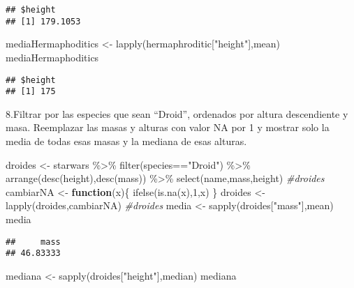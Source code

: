 \documentclass[
]{book}
\newenvironment{Shaded}{\begin{snugshade}}{\end{snugshade}}
\newcommand{\CommentTok}[1]{\textcolor[rgb]{0.56,0.35,0.01}{\textit{#1}}}
\newcommand{\ControlFlowTok}[1]{\textcolor[rgb]{0.13,0.29,0.53}{\textbf{#1}}}
\newcommand{\DecValTok}[1]{\textcolor[rgb]{0.00,0.00,0.81}{#1}}
\newcommand{\FunctionTok}[1]{\textcolor[rgb]{0.00,0.00,0.00}{#1}}
\newcommand{\NormalTok}[1]{#1}
\newcommand{\OtherTok}[1]{\textcolor[rgb]{0.56,0.35,0.01}{#1}}
\newcommand{\SpecialCharTok}[1]{\textcolor[rgb]{0.00,0.00,0.00}{#1}}
\newcommand{\StringTok}[1]{\textcolor[rgb]{0.31,0.60,0.02}{#1}}
\begin{document}
\begin{verbatim}
## $height
## [1] 179.1053
\end{verbatim}

\begin{Shaded}
\begin{Highlighting}[]
\NormalTok{mediaHermaphoditics }\OtherTok{\textless{}{-}} \FunctionTok{lapply}\NormalTok{(hermaphroditic[}\StringTok{"height"}\NormalTok{],mean)}
\NormalTok{mediaHermaphoditics}
\end{Highlighting}
\end{Shaded}

\begin{verbatim}
## $height
## [1] 175
\end{verbatim}

8.Filtrar por las especies que sean ``Droid'', ordenados por altura descendiente y masa. Reemplazar las masas y alturas con valor NA por 1 y mostrar solo la media de todas esas masas y la mediana de esas alturas.

\begin{Shaded}
\begin{Highlighting}[]
\NormalTok{droides }\OtherTok{\textless{}{-}}\NormalTok{ starwars }\SpecialCharTok{\%\textgreater{}\%} \FunctionTok{filter}\NormalTok{(species}\SpecialCharTok{==}\StringTok{"Droid"}\NormalTok{) }\SpecialCharTok{\%\textgreater{}\%} \FunctionTok{arrange}\NormalTok{(}\FunctionTok{desc}\NormalTok{(height),}\FunctionTok{desc}\NormalTok{(mass)) }\SpecialCharTok{\%\textgreater{}\%} \FunctionTok{select}\NormalTok{(name,mass,height)}
\CommentTok{\#droides}
\NormalTok{cambiarNA }\OtherTok{\textless{}{-}} \ControlFlowTok{function}\NormalTok{(x)\{}
  \FunctionTok{ifelse}\NormalTok{(}\FunctionTok{is.na}\NormalTok{(x),}\DecValTok{1}\NormalTok{,x)}
\NormalTok{\}}
\NormalTok{droides }\OtherTok{\textless{}{-}} \FunctionTok{lapply}\NormalTok{(droides,cambiarNA)}
\CommentTok{\#droides}
\NormalTok{media }\OtherTok{\textless{}{-}} \FunctionTok{sapply}\NormalTok{(droides[}\StringTok{"mass"}\NormalTok{],mean)}
\NormalTok{media}
\end{Highlighting}
\end{Shaded}

\begin{verbatim}
##     mass 
## 46.83333
\end{verbatim}

\begin{Shaded}
\begin{Highlighting}[]
\NormalTok{mediana }\OtherTok{\textless{}{-}} \FunctionTok{sapply}\NormalTok{(droides[}\StringTok{"height"}\NormalTok{],median)}
\NormalTok{mediana}
\end{Highlighting}
\end{Shaded}
\end{document}
